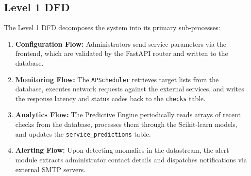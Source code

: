 \documentclass[12pt,a4paper,oneside]{report}
\begin{document}
\subsection{Level 1 DFD}
\noindent The Level 1 DFD decomposes the system into its primary sub-processes:
\begin{enumerate}
    \item \textbf{Configuration Flow:} Administrators send service parameters via the frontend, which are validated by the FastAPI router and written to the database.
    \item \textbf{Monitoring Flow:} The \texttt{APScheduler} retrieves target lists from the database, executes network requests against the external services, and writes the response latency and status codes back to the \texttt{checks} table.
    \item \textbf{Analytics Flow:} The Predictive Engine periodically reads arrays of recent checks from the database, processes them through the Scikit-learn models, and updates the \texttt{service\_predictions} table.
    \item \textbf{Alerting Flow:} Upon detecting anomalies in the datastream, the alert module extracts administrator contact details and dispatches notifications via external SMTP servers.
\end{enumerate}
\end{document}
